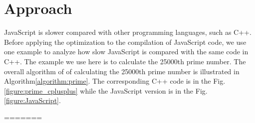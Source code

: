\documentclass[conference]{IEEEtran}
\begin{document}
\section{Approach}
JavaScript is slower compared with other programming languages, such as C++. Before applying the optimization to the compilation of JavaScript code, we use one example to analyze how slow JavaScript is compared with the same code in C++. The example we use here is to calculate the 25000th prime number\cite{google_IO}. The overall algorithm of of calculating the 25000th prime number is illustrated in Algorithm\ref{algorithm:prime}.
The corresponding C++ code is in the Fig.\ref{figure:prime_cplusplus} while the JavaScript version is in the Fig.\ref{figure:JavaScript}.

=======
%
%
%
%
%
%
\end{document}
